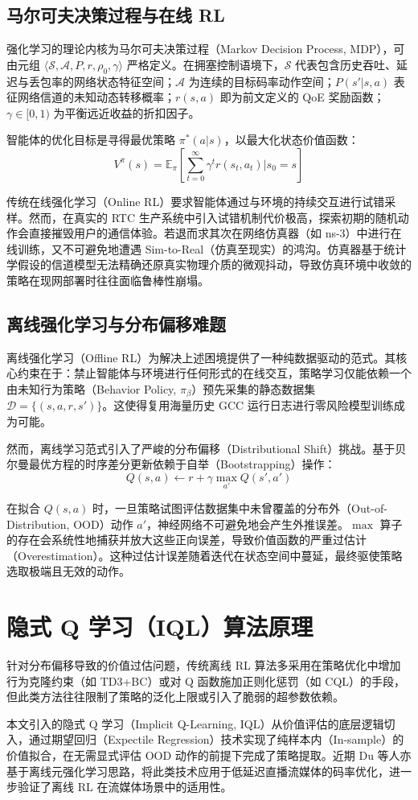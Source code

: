 \subsection{马尔可夫决策过程与在线 RL}
强化学习的理论内核为马尔可夫决策过程（Markov Decision Process, MDP）\cite{Sutton2018RL}，可由元组 $\langle \mathcal{S}, \mathcal{A}, P, r, \rho_0, \gamma \rangle$ 严格定义。在拥塞控制语境下，$\mathcal{S}$ 代表包含历史吞吐、延迟与丢包率的网络状态特征空间；$\mathcal{A}$ 为连续的目标码率动作空间；$P(s'|s,a)$ 表征网络信道的未知动态转移概率；$r(s,a)$ 即为前文定义的 QoE 奖励函数；$\gamma \in [0, 1)$ 为平衡远近收益的折扣因子。
\par 智能体的优化目标是寻得最优策略 $\pi^*(a|s)$，以最大化状态价值函数：
$$V^\pi(s) = \mathbb{E}_{\pi} \left[ \sum_{t=0}^{\infty} \gamma^t r(s_t, a_t) \Big| s_0 = s \right]$$
\par 传统在线强化学习（Online RL）要求智能体通过与环境的持续交互进行试错采样\cite{Mnih2015DQN,Mao2017Pensieve}。然而，在真实的 RTC 生产系统中引入试错机制代价极高，探索初期的随机动作会直接摧毁用户的通信体验。若退而求其次在网络仿真器（如 ns-3）中进行在线训练，又不可避免地遭遇 Sim-to-Real（仿真至现实）的鸿沟。仿真器基于统计学假设的信道模型无法精确还原真实物理介质的微观抖动，导致仿真环境中收敛的策略在现网部署时往往面临鲁棒性崩塌。
\subsection{离线强化学习与分布偏移难题}
离线强化学习（Offline RL）为解决上述困境提供了一种纯数据驱动的范式\cite{Levine2020OfflineRL}。其核心约束在于：禁止智能体与环境进行任何形式的在线交互，策略学习仅能依赖一个由未知行为策略（Behavior Policy, $\pi_\beta$）预先采集的静态数据集 $\mathcal{D} = \{(s, a, r, s')\}$。这使得复用海量历史 GCC 运行日志进行零风险模型训练成为可能。
\par 然而，离线学习范式引入了严峻的分布偏移（Distributional Shift）挑战。基于贝尔曼最优方程的时序差分更新依赖于自举（Bootstrapping）操作：
$$Q(s,a) \leftarrow r + \gamma \max_{a'} Q(s', a')$$
\par 在拟合 $Q(s,a)$ 时，一旦策略试图评估数据集中未曾覆盖的分布外（Out-of-Distribution, OOD）动作 $a'$，神经网络不可避免地会产生外推误差\cite{Fujimoto2019BCQ}。$\max$ 算子的存在会系统性地捕获并放大这些正向误差，导致价值函数的严重过估计（Overestimation）。这种过估计误差随着迭代在状态空间中蔓延，最终驱使策略选取极端且无效的动作。

\section{隐式 Q 学习（IQL）算法原理}
针对分布偏移导致的价值过估问题，传统离线 RL 算法多采用在策略优化中增加行为克隆约束（如 TD3+BC\cite{Fujimoto2021TD3BC}）或对 Q 函数施加正则化惩罚（如 CQL\cite{Kumar2020CQL}）的手段，但此类方法往往限制了策略的泛化上限或引入了脆弱的超参数依赖。
\par 本文引入的隐式 Q 学习（Implicit Q-Learning, IQL）\cite{Kostrikov2021IQL}从价值评估的底层逻辑切入，通过期望回归（Expectile Regression）技术实现了纯样本内（In-sample）的价值拟合，在无需显式评估 OOD 动作的前提下完成了策略提取。近期 Du 等人\cite{Du2025LLLS}亦基于离线元强化学习思路，将此类技术应用于低延迟直播流媒体的码率优化，进一步验证了离线 RL 在流媒体场景中的适用性。
